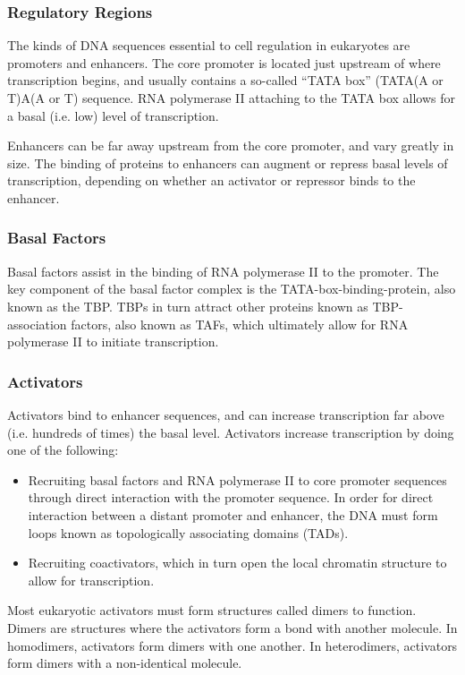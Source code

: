 \documentclass[12pt,titlepage]{article}
\begin{document}
      \subsubsection{Regulatory Regions}
        The kinds of DNA sequences essential to cell regulation in eukaryotes are promoters and enhancers. The core promoter is located just upstream of where
        transcription begins, and usually contains a so-called ``TATA box'' (TATA(A or T)A(A or T) sequence. RNA polymerase II attaching to the TATA box
        allows for a basal (i.e. low) level of transcription.

        Enhancers can be far away upstream from the core promoter, and vary greatly in size. The binding of proteins to enhancers can augment or repress basal
        levels of transcription, depending on whether an activator or repressor binds to the enhancer.

      \subsubsection{Basal Factors}
        Basal factors assist in the binding of RNA polymerase II to the promoter. The key component of the basal factor complex is the TATA-box-binding-protein,
        also known as the TBP. TBPs in turn attract other proteins known as TBP-association factors, also known as TAFs, which ultimately allow for
        RNA polymerase II to initiate transcription.

      \subsubsection{Activators}
        Activators bind to enhancer sequences, and can increase transcription far above (i.e. hundreds of times) the basal level. Activators increase
        transcription by doing one of the following:
        \begin{itemize}
          \item Recruiting basal factors and RNA polymerase II to core promoter sequences through direct interaction with the promoter sequence. In order
            for direct interaction between a distant promoter and enhancer, the DNA must form loops known as topologically associating domains (TADs).
          \item Recruiting coactivators, which in turn open the local chromatin structure to allow for transcription.
        \end{itemize}

        Most eukaryotic activators must form structures called dimers to function. Dimers are structures where the activators form a bond with another molecule.
        In homodimers, activators form dimers with one another. In heterodimers, activators form dimers with a non-identical molecule.
\end{document}
